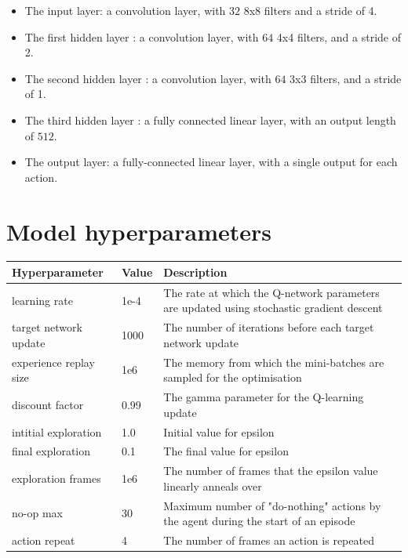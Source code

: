 \documentclass[conference]{IEEEtran}
\begin{document}
\begin{itemize}
    \item The input layer: a convolution layer, with $32$ 8x8 filters and a stride of 4. 
    \item The first hidden layer : a convolution layer, with $64$ 4x4 filters, and a stride of 2. 
    \item The second hidden layer : a convolution layer, with $64$ 3x3 filters, and a stride of 1. 
    \item The third hidden layer : a fully connected linear layer, with an output length of $512$. 
    \item The output layer: a fully-connected linear layer, with a single output for each action.
\end{itemize}  




\clearpage
\appendices
\section{Model hyperparameters}
\label{appendix}
\begin{table}[!ht]
\begin{tabular}{|l|l|l|}
\hline
\textbf{Hyperparameter} & \textbf{Value} & \textbf{Description}                                              \\ \hline
learning rate          & 1e-4 & The rate at which the Q-network parameters are updated using stochastic gradient descent \\
target network update   & 1000           & The number of iterations before each target network update        \\
experience replay size & 1e6  & The memory from which the mini-batches are sampled for the optimisation                  \\
discount factor         & 0.99           & The gamma parameter for the Q-learning update                     \\
intitial exploration    & 1.0            & Initial value for epsilon                                         \\
final exploration       & 0.1            & The final value for epsilon                                       \\
exploration frames      & 1e6            & The number of frames that the epsilon value linearly anneals over \\
no-op max              & 30   & Maximum number of "do-nothing" actions by the agent during the start of an episode       \\
action repeat           & 4              & The number of frames an action is repeated                        \\ \hline
\end{tabular}
\end{table}
\end{document}
